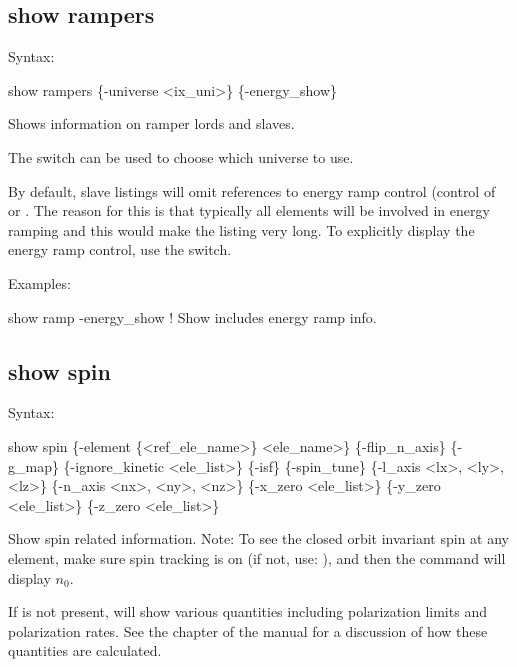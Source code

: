 {{{{{{{{{%

\subsection{show rampers}
\label{s:show.ramp}

Syntax:
\begin{example}
  show rampers \{-universe <ix_uni>\} \{-energy_show\}
\end{example}

Shows information on ramper lords and slaves.

The  switch can be used to choose which universe to use.

By default, slave listings will omit references to energy ramp control (control of  or .
The reason for this is that typically all elements will be involved in energy ramping and this would make
the listing very long. To explicitly display the energy ramp control, use the  switch.

Examples:
\begin{example}
  show ramp -energy_show  ! Show includes energy ramp info.
\end{example}


\subsection{show spin}
\label{s:show.spin}

Syntax:
\begin{example}
  show spin \{-element \{<ref_ele_name>\} <ele_name>\} \{-flip_n_axis\} \{-g_map\}
                  \{-ignore_kinetic <ele_list>\} \{-isf\} \{-spin_tune\}
                  \{-l_axis <lx>, <ly>, <lz>\} \{-n_axis <nx>, <ny>, <nz>\} 
                  \{-x_zero <ele_list>\} \{-y_zero <ele_list>\} \{-z_zero <ele_list>\}
\end{example}

Show spin related information.  Note: To see the closed orbit invariant spin at any element, make
sure spin tracking is on (if not, use: ), and then the
 command will display $n_0$.

If  is not present,  will show various quantities including polarization
limits and polarization rates. See the  chapter of the \bmad manual for a
discussion of how these quantities are calculated.

}}}}}}}}}
